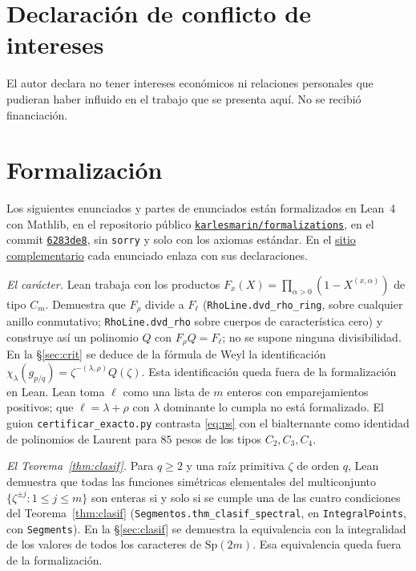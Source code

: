 \documentclass[11pt,a4paper]{article}
\newcommand{\Sp}{\mathrm{Sp}}
\begin{document}
\section*{Declaración de conflicto de intereses}

\noindent El autor declara no tener intereses económicos ni relaciones personales que pudieran
haber influido en el trabajo que se presenta aquí. No se recibió financiación.

\section*{Formalización}

\noindent Los siguientes enunciados y partes de enunciados están formalizados en Lean~4 con Mathlib,
en el repositorio público
\href{https://github.com/karlesmarin/formalizations}{\texttt{karlesmarin/formalizations}}, en el
commit \href{https://github.com/karlesmarin/formalizations/commit/6283de8ed4582c42d045e8b9e71b1a8512340c77}{\texttt{6283de8}}, sin \texttt{sorry} y solo con los axiomas estándar. En el
\href{https://karlesmarin.github.io/blueprints/characters-at-aP/}{sitio complementario} cada
enunciado enlaza con sus declaraciones.

\smallskip
\noindent \emph{El carácter.} Lean trabaja con los productos
$F_x(X)=\prod_{\alpha>0}(1-X^{(x,\alpha)})$ de tipo $C_m$. Demuestra que $F_\rho$ divide a
$F_\ell$ (\texttt{RhoLine.}\allowbreak\texttt{dvd\_rho\_ring}, sobre cualquier anillo conmutativo;
\texttt{RhoLine.}\allowbreak\texttt{dvd\_rho} sobre cuerpos de característica cero) y construye así un
polinomio $Q$ con $F_\rho Q=F_\ell$; no se supone ninguna divisibilidad. En la
\S\ref{sec:crit} se deduce de la fórmula de Weyl la identificación
$\chi_\lambda(g_{p/q})=\zeta^{-(\lambda,\rho)}Q(\zeta)$. Esta identificación queda fuera de la
formalización en Lean. Lean toma $\ell$ como una lista de $m$ enteros con emparejamientos
positivos; que $\ell=\lambda+\rho$ con $\lambda$ dominante lo cumpla no está formalizado. El guion
\texttt{certificar\_exacto.py} contrasta \eqref{eq:ps} con el
bialternante como identidad de polinomios de Laurent para $85$ pesos de los tipos $C_2,C_3,C_4$.

\smallskip
\noindent \emph{El Teorema~\ref{thm:clasif}.} Para $q\ge2$ y una raíz primitiva $\zeta$ de orden
$q$, Lean demuestra que todas las funciones simétricas elementales del multiconjunto
$\{\zeta^{\pm j}:1\le j\le m\}$ son enteras si y solo si se cumple una de las cuatro condiciones del
Teorema~\ref{thm:clasif} (\texttt{Segmentos.}\allowbreak\texttt{thm\_clasif\_spectral}, en \texttt{IntegralPoints}, con
\texttt{Segments}). En la \S\ref{sec:clasif} se demuestra la equivalencia con la integralidad de los
valores de todos los caracteres de $\Sp(2m)$. Esa equivalencia queda fuera de la formalización.
\end{document}
